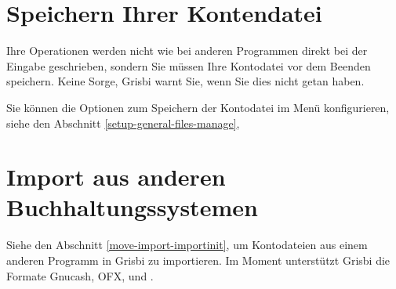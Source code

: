 \section{Speichern Ihrer Kontendatei\label{start-save}}%

Ihre Operationen werden nicht wie bei anderen Programmen direkt bei der Eingabe geschrieben, sondern Sie müssen Ihre Kontodatei vor dem Beenden speichern. Keine Sorge, Grisbi warnt Sie, wenn Sie dies nicht getan haben.%

Sie können die Optionen zum Speichern der Kontodatei im Menü  konfigurieren, siehe den Abschnitt \vref{setup-general-files-manage}, %


\section{Import aus anderen Buchhaltungssystemen}%

Siehe den Abschnitt \vref{move-import-importinit}, um Kontodateien aus einem anderen Programm in Grisbi zu importieren. Im Moment unterstützt Grisbi die Formate \gls{Gnucash}, \gls{OFX},  und .%